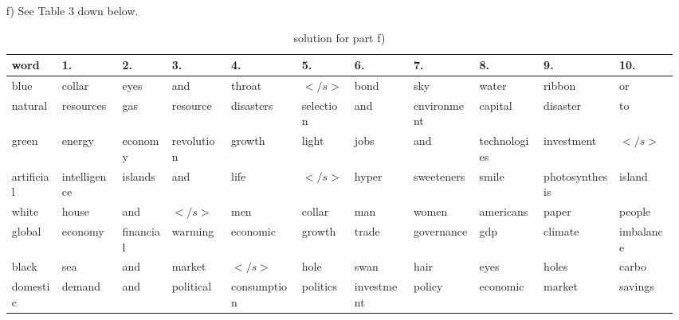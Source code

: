 \documentclass{article}
\begin{document}
\begin{itemize}
 	\item[f)] See Table 3 down below.
 	\begin{table}[h]
 	\begin{adjustbox}{width=\columnwidth,center}
 	\begin{tabular}{l | l l l l l l l l l l}
 	word &1.&2.&3.&4.&5.&6.&7.&8.&9.&10.\\\hline
blue &collar  &eyes & and&  throat&  $</s>$&  bond&  sky&  water&  ribbon&  or\\
natural&resources  &gas&  resource&  disasters&  selection&  and& environment& capital&  disaster&  to\\
green&energy  &economy& revolution&  growth&  light& jobs& and& technologies&  investment&  $</s>$\\
artificial&intelligence&  islands& and& life& $</s>$& hyper& sweeteners& smile& photosynthesis& island\\
white&house&  and&  $</s>$& men&  collar& man& women& americans& paper& people\\
global&economy&  financial&  warming&  economic&  growth&  trade&  governance& gdp&  climate& imbalance\\
black&sea&  and&  market&  $</s>$& hole& swan& hair& eyes& holes& carbo\\
domestic&demand&  and&  political&  consumption& politics&  investment&  policy&  economic& market& savings\\
\end{tabular}
\end{adjustbox}
\caption{solution for part f)}
\end{table}
\end{itemize}
\end{document}
